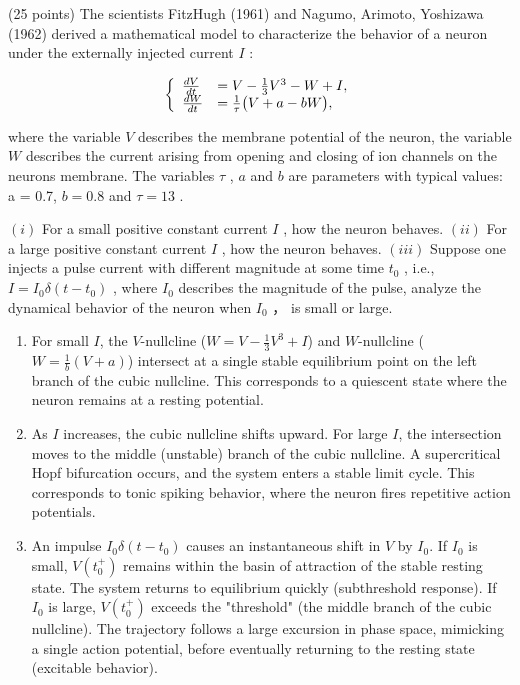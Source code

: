 \begin{exercise}
\label{applied:2019:4}
(25 points) The scientists FitzHugh (1961) and Nagumo, Arimoto, Yoshizawa (1962) derived a mathematical model to characterize the behavior of a neuron under the externally injected current $I$ :

\[
\left\{ \begin{array}{l l} \frac {d V}{d t} & = V - \frac {1}{3} V ^ {3} - W + I, \\ \frac {d W}{d t} & = \frac {1}{\tau} \big (V + a - b W \big), \end{array} \right.
\]

where the variable $V$ describes the membrane potential of the neuron, the variable $W$ describes the current arising from opening and closing of ion channels on the neurons membrane. The variables $\tau$ , $a$ and $b$ are parameters with typical values: a = 0.7, $b = 0 . 8$ and $\tau = 1 3$ .

$( i )$ For a small positive constant current $I$ , how the neuron behaves.   
$( i i )$ For a large positive constant current $I$ , how the neuron behaves.   
$( i i i )$ Suppose one injects a pulse current with different magnitude at some time $t _ { 0 }$ , i.e., $I = I _ { 0 } \delta ( t - t _ { 0 } )$ , where $I _ { 0 }$ describes the magnitude of the pulse, analyze the dynamical behavior of the neuron when $I _ { 0 }$ ， is small or large.
\end{exercise}

\begin{solution}
\begin{enumerate}
    \item[(i)] For small $I$, the $V$-nullcline ($W = V - \frac{1}{3}V^3 + I$) and $W$-nullcline ($W = \frac{1}{b}(V+a)$) intersect at a single stable equilibrium point on the left branch of the cubic nullcline. This corresponds to a quiescent state where the neuron remains at a resting potential.

    \item[(ii)] As $I$ increases, the cubic nullcline shifts upward. For large $I$, the intersection moves to the middle (unstable) branch of the cubic nullcline. A supercritical Hopf bifurcation occurs, and the system enters a stable limit cycle. This corresponds to tonic spiking behavior, where the neuron fires repetitive action potentials.

    \item[(iii)] An impulse $I_0 \delta(t - t_0)$ causes an instantaneous shift in $V$ by $I_0$.
    If $I_0$ is small, $V(t_0^+)$ remains within the basin of attraction of the stable resting state. The system returns to equilibrium quickly (subthreshold response).
    If $I_0$ is large, $V(t_0^+)$ exceeds the "threshold" (the middle branch of the cubic nullcline). The trajectory follows a large excursion in phase space, mimicking a single action potential, before eventually returning to the resting state (excitable behavior).
\end{enumerate}
\end{solution}

